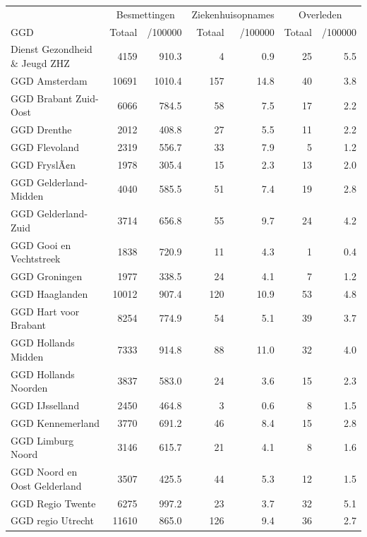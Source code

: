 \documentclass[
  english,
  man,floatsintext]{apa6}
\begin{document}
\begin{table}[H]
\centering\begingroup\fontsize{10}{12}\selectfont

\begin{threeparttable}
\begin{tabular}{lrrrrrr}
\toprule
\multicolumn{1}{c}{ } & \multicolumn{2}{c}{Besmettingen} & \multicolumn{2}{c}{Ziekenhuisopnames} & \multicolumn{2}{c}{Overleden} \\
\cmidrule(l{3pt}r{3pt}){2-3} \cmidrule(l{3pt}r{3pt}){4-5} \cmidrule(l{3pt}r{3pt}){6-7}
GGD & Totaal & /100000 & Totaal & /100000 & Totaal & /100000\\
\midrule
Dienst Gezondheid \& Jeugd ZHZ & 4159 & 910.3 & 4 & 0.9 & 25 & 5.5\\
GGD Amsterdam & 10691 & 1010.4 & 157 & 14.8 & 40 & 3.8\\
GGD Brabant Zuid-Oost & 6066 & 784.5 & 58 & 7.5 & 17 & 2.2\\
GGD Drenthe & 2012 & 408.8 & 27 & 5.5 & 11 & 2.2\\
GGD Flevoland & 2319 & 556.7 & 33 & 7.9 & 5 & 1.2\\
GGD FryslÃ¢n & 1978 & 305.4 & 15 & 2.3 & 13 & 2.0\\
GGD Gelderland-Midden & 4040 & 585.5 & 51 & 7.4 & 19 & 2.8\\
GGD Gelderland-Zuid & 3714 & 656.8 & 55 & 9.7 & 24 & 4.2\\
GGD Gooi en Vechtstreek & 1838 & 720.9 & 11 & 4.3 & 1 & 0.4\\
GGD Groningen & 1977 & 338.5 & 24 & 4.1 & 7 & 1.2\\
GGD Haaglanden & 10012 & 907.4 & 120 & 10.9 & 53 & 4.8\\
GGD Hart voor Brabant & 8254 & 774.9 & 54 & 5.1 & 39 & 3.7\\
GGD Hollands Midden & 7333 & 914.8 & 88 & 11.0 & 32 & 4.0\\
GGD Hollands Noorden & 3837 & 583.0 & 24 & 3.6 & 15 & 2.3\\
GGD IJsselland & 2450 & 464.8 & 3 & 0.6 & 8 & 1.5\\
GGD Kennemerland & 3770 & 691.2 & 46 & 8.4 & 15 & 2.8\\
GGD Limburg Noord & 3146 & 615.7 & 21 & 4.1 & 8 & 1.6\\
GGD Noord en Oost Gelderland & 3507 & 425.5 & 44 & 5.3 & 12 & 1.5\\
GGD Regio Twente & 6275 & 997.2 & 23 & 3.7 & 32 & 5.1\\
GGD regio Utrecht & 11610 & 865.0 & 126 & 9.4 & 36 & 2.7\\

\end{tabular}
\end{threeparttable}
\end{table}
\end{document}
